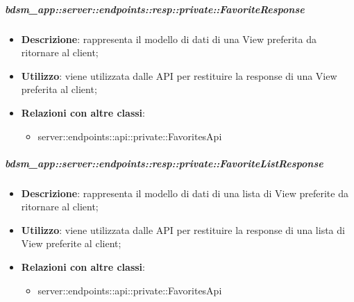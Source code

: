     \subparagraph{bdsm\_app::server::endpoints::resp::private::FavoriteResponse} %
    \label{subp:bdsm_app_server_endpoints_resp_private_favoriteresponse}
    \begin{itemize}
      \item \textbf{Descrizione}: rappresenta il modello di dati di una View preferita da ritornare al client;
      \item \textbf{Utilizzo}: viene utilizzata dalle API per restituire la response di una View preferita al client;
      \item \textbf{Relazioni con altre classi}:
        \begin{itemize}
          \item server::endpoints::api::private::FavoritesApi
        \end{itemize}
      \end{itemize}
    
    \subparagraph{bdsm\_app::server::endpoints::resp::private::FavoriteListResponse} %
    \label{subp:bdsm_app_server_endpoints_resp_private_favoritelistresponse}
    \begin{itemize}
      \item \textbf{Descrizione}: rappresenta il modello di dati di una lista di View preferite da ritornare al client;
      \item \textbf{Utilizzo}: viene utilizzata dalle API per restituire la response di una lista di View preferite al client;
      \item \textbf{Relazioni con altre classi}:
        \begin{itemize}
          \item server::endpoints::api::private::FavoritesApi
        \end{itemize}
      \end{itemize}
